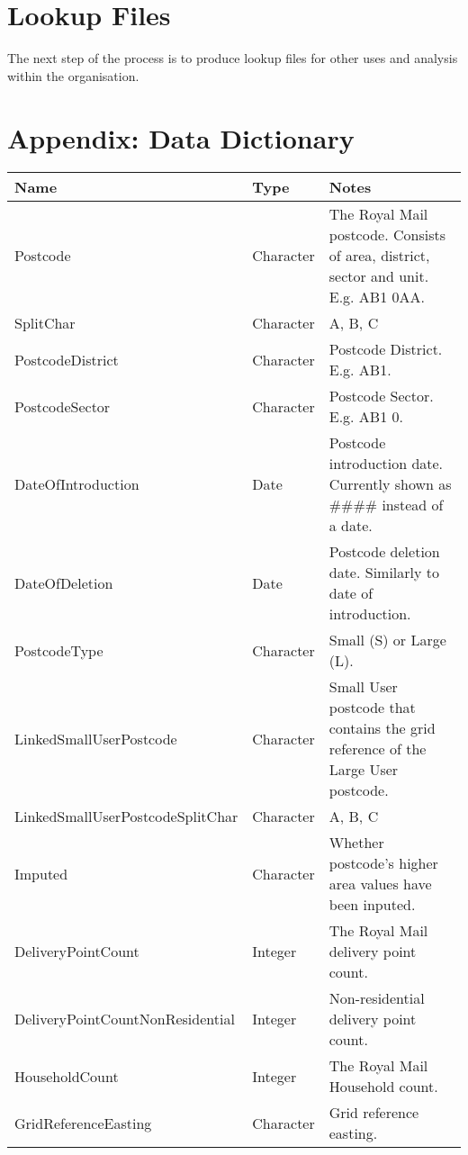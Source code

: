 \documentclass[12pt]{article}
\begin{document}
\section{Lookup Files}
The next step of the process is to produce lookup files for
other uses and analysis within the organisation.



\appendix
\section{Appendix: Data Dictionary}\label{appendix:dict}

\begin{longtable}{|| m{} | m{} | m{}||} 
\hline
\textbf{Name} & \textbf{Type} & \textbf{Notes} \\
\hline\hline
Postcode & Character & The Royal Mail postcode. Consists of area, district, sector and unit. E.g. AB1 0AA.\\ \hline
SplitChar & Character & A, B, C \\ \hline
PostcodeDistrict & Character & Postcode District. E.g. AB1. \\ \hline
PostcodeSector & Character & Postcode Sector. E.g. AB1 0.\\ \hline
DateOfIntroduction & Date & Postcode introduction date. Currently shown as $\#\#\#\#$ instead of a date. \\ \hline
DateOfDeletion & Date & Postcode deletion date.
Similarly to date of introduction. \\ \hline
PostcodeType & Character & Small (S) or Large (L).\\ \hline
LinkedSmallUserPostcode & Character & Small User postcode that
contains the grid reference of the Large User postcode.\\ \hline
LinkedSmallUserPostcodeSplitChar & Character & A, B, C\\ \hline
Imputed & Character & Whether postcode's higher area values
have been inputed.\\ \hline
DeliveryPointCount & Integer & The Royal Mail delivery point count.\\ \hline
DeliveryPointCountNonResidential & Integer & Non-residential delivery point count.\\ \hline
HouseholdCount & Integer & The Royal Mail Household count.\\ \hline
GridReferenceEasting & Character & Grid reference easting.\\ \hline

\end{longtable}
\end{document}
